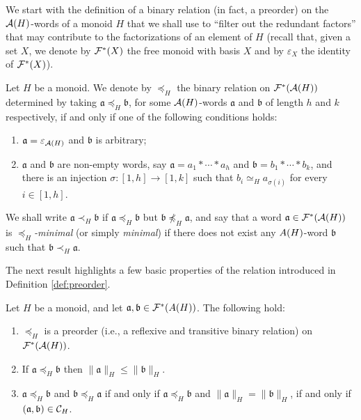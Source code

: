\label{subsec:min-factorizations}
We start with the definition of a binary relation (in fact, a preorder) on the $\mathcal{A}(H)$-words of a monoid $H$ that we shall use to ``filter out the redundant factors'' that may contribute to the factorizations of an element of $H$
(recall that, given a set $X$, we denote by $\mathcal{F}^\ast(X)$ the free monoid with basis $X$ and by $\varepsilon_X$ the identity of $\mathcal{F}^\ast(X)$).
%
\begin{defn}\label{def:preorder}
	Let $H$ be a monoid. We denote by $\preceq_H$ 
	the binary relation on $\mathcal{F}^\ast(\mathcal{A}(H))$ determined by taking $\mathfrak a \preceq_H \mathfrak b$, for some  
	$\mathcal{A}(H)$-words $\mathfrak a$ and $\mathfrak b$ of length $h$ and $k$ respectively, if and only if one of the following conditions holds:
	\begin{enumerate}[label=$\bullet$]
	\item $\mathfrak a = \varepsilon_{\mathcal{A}(H)}$ and $\mathfrak b$ is arbitrary;
	\item $\mathfrak a$ and $\mathfrak b$ are non-empty words, say $\mathfrak a = a_1 \ast \cdots \ast a_h$ and $\mathfrak b = b_1 \ast \cdots \ast b_k$, and
	there is an injection $\sigma: [ 1, h ] \to [ 1, k ]$ such that $b_i \simeq_H a_{\sigma(i)}$ for every $i \in [ 1, h ]$. 
	\end{enumerate}
	We shall write $\mathfrak{a} \prec_H \mathfrak{b}$ if $\mathfrak{a} \preceq_H \mathfrak{b}$ but $\mathfrak{b} \not\preceq_H \mathfrak{a}$, and say that a word $\mathfrak{a} \in \mathcal{F}^\ast(\mathcal{A}(H))$ is \emph{$\preceq_H$-minimal} (or simply \emph{minimal}) if there does not exist any $\\A(H)$-word $\mathfrak{b}$ such that $\mathfrak{b} \prec_H \mathfrak{a}$.
\end{defn}
%
The next result highlights a few basic properties of the relation introduced in Definition \ref{def:preorder}.
%
\begin{prop}\label{preorder-facts}
Let $H$ be a monoid, and let $\mathfrak{a},\mathfrak{b}\in \mathcal{F}^*(\\A(H))$. The following hold:
\begin{enumerate}[label = {\textup{(\roman{*})}}]
%
\item\label{it:prop:preorder-facts(0)} $\preceq_H$ is a preorder \textup{(}i.e., a reflexive and transitive binary relation\textup{)} on $\mathcal{F}^\ast(\mathcal{A}(H))$.
%
\item\label{it:prop:preorder-facts(ii)} If $\mathfrak{a} \preceq_H \mathfrak{b}$ then $\| \mathfrak{a} \|_H \le \| \mathfrak{b} \|_H$.
%
\item\label{it:prop:preorder-facts(iv)} $\mathfrak{a} \preceq_H \mathfrak{b}$ and $\mathfrak{b} \preceq_H \mathfrak{a}$ if and only if $\mathfrak a \preceq_H \mathfrak b$ and $\|\mathfrak a\|_H = \|\mathfrak b\|_H$, if and only if $(\mathfrak{a},\mathfrak{b}) \in \mathcal{C}_H$.
\end{enumerate}
\end{prop}

